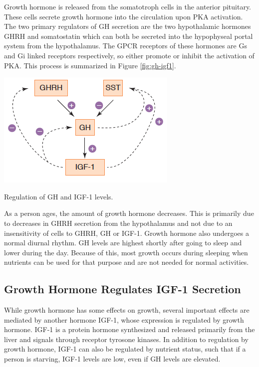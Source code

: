 \documentclass{tufte-handout}
\begin{document}
Growth hormone is released from the somatotroph cells in the anterior pituitary.  These cells secrete growth hormone into the circulation upon PKA activation.  The two primary regulators of GH secretion are the two hypothalamic hormones GHRH and somatostatin which can both be secreted into the hypophyseal portal system from the hypothalamus.  The GPCR receptors of these hormones are Gs and Gi linked receptors respectively, so either promote or inhibit the activation of PKA.  This process is summarized in Figure \ref{fig:gh-igf1}.


\begin{marginfigure}
  \includegraphics{figures/gh-igf1}
  \caption{Regulation of GH and IGF-1 levels.}
    \label{fig:gh-igf1}
\end{marginfigure}

  As a person ages, the amount of growth hormone decreases.  This is primarily due to decreases in GHRH secretion from the hypothalamus and not due to an insensitivity of cells to GHRH, GH or IGF-1.  Growth hormone also undergoes a normal diurnal rhythm.  GH levels are highest shortly after going to sleep and lower during the day.  Because of this, most growth occurs during sleeping when nutrients can be used for that purpose and are not needed for normal activities.

\subsection{Growth Hormone Regulates IGF-1 Secretion}

While growth hormone has some effects on growth, several important effects are mediated by another hormone IGF-1, whose expression is regulated by growth hormone.  IGF-1 is a protein hormone synthesized and released primarily from the liver and signals through receptor tyrosone kinases.  In addition to regulation by growth hormone, IGF-1 can also be regulated by nutrient status, such that if a person is starving, IGF-1 levels are low, even if GH levels are elevated.
\end{document}
